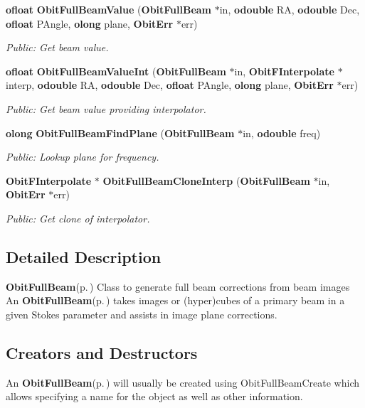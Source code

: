 \begin{CompactItemize}
{\bf ofloat} {\bf Obit\-Full\-Beam\-Value} ({\bf Obit\-Full\-Beam} $\ast$in, {\bf odouble} RA, {\bf odouble} Dec, {\bf ofloat} PAngle, {\bf olong} plane, {\bf Obit\-Err} $\ast$err)
\begin{CompactList}\small\item\em Public: Get beam value. \item\end{CompactList}\item 
{\bf ofloat} {\bf Obit\-Full\-Beam\-Value\-Int} ({\bf Obit\-Full\-Beam} $\ast$in, {\bf Obit\-FInterpolate} $\ast$interp, {\bf odouble} RA, {\bf odouble} Dec, {\bf ofloat} PAngle, {\bf olong} plane, {\bf Obit\-Err} $\ast$err)
\begin{CompactList}\small\item\em Public: Get beam value providing interpolator. \item\end{CompactList}\item 
{\bf olong} {\bf Obit\-Full\-Beam\-Find\-Plane} ({\bf Obit\-Full\-Beam} $\ast$in, {\bf odouble} freq)
\begin{CompactList}\small\item\em Public: Lookup plane for frequency. \item\end{CompactList}\item 
{\bf Obit\-FInterpolate} $\ast$ {\bf Obit\-Full\-Beam\-Clone\-Interp} ({\bf Obit\-Full\-Beam} $\ast$in, {\bf Obit\-Err} $\ast$err)
\begin{CompactList}\small\item\em Public: Get clone of interpolator. \item\end{CompactList}\end{CompactItemize}


\subsection{Detailed Description}
{\bf Obit\-Full\-Beam}{\rm (p.\,\pageref{structObitFullBeam})} Class to generate full beam corrections from beam images An {\bf Obit\-Full\-Beam}{\rm (p.\,\pageref{structObitFullBeam})} takes images or (hyper)cubes of a primary beam in a given Stokes parameter and assists in image plane corrections. 

\subsection{Creators and Destructors}\label{ObitFullBeam_8h_ObitFullBeamaccess}
An {\bf Obit\-Full\-Beam}{\rm (p.\,\pageref{structObitFullBeam})} will usually be created using Obit\-Full\-Beam\-Create which allows specifying a name for the object as well as other information.

